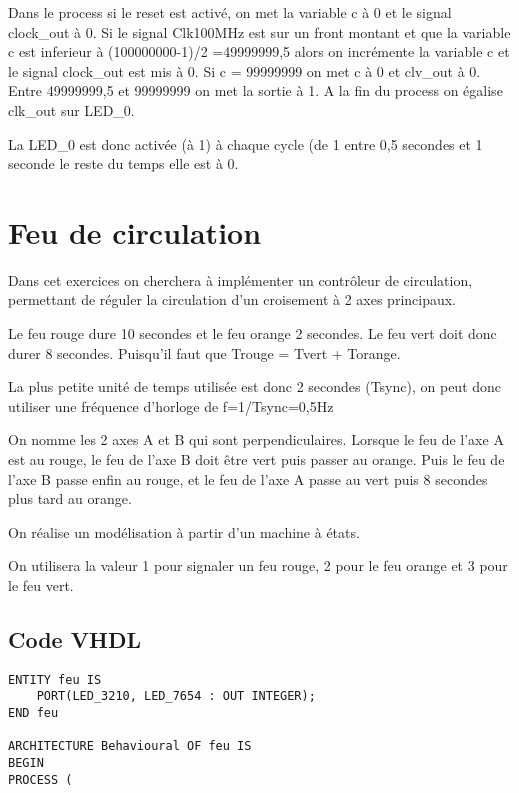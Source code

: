 \documentclass[11pt]{report}
\begin{document}
Dans le process si le reset est activé, on met la variable c à 0 et le signal clock\_out à 0. Si le signal Clk100MHz est sur un front montant et que la variable c est inferieur à (100000000-1)/2 =49999999,5 alors on incrémente la variable c et le signal clock\_out est mis à 0. Si c = 99999999 on met c à 0 et clv\_out à 0. Entre 49999999,5 et 99999999 on met la sortie à 1.
A la fin du process on égalise clk\_out sur LED\_0.

La LED\_0 est donc activée (à 1) à chaque cycle (de 1 entre 0,5 secondes et 1 seconde le reste du temps elle est à 0. 


\section{Feu de circulation}

Dans cet exercices on cherchera à implémenter un contrôleur de circulation, permettant de réguler la circulation d'un croisement à 2 axes principaux. 

Le feu rouge dure 10 secondes et le feu orange 2 secondes. Le feu vert doit donc durer 8 secondes. Puisqu'il faut que Trouge = Tvert + Torange. 

La plus petite unité de temps utilisée est donc 2 secondes (Tsync), on  peut donc utiliser une fréquence d'horloge de f=1/Tsync=0,5Hz

On nomme les 2 axes A et B qui sont perpendiculaires. Lorsque le feu de l'axe A est au rouge, le feu de l'axe B doit être vert puis passer au orange. Puis le feu de l'axe B passe enfin au rouge, et le feu de l'axe A passe au vert puis 8 secondes plus tard au orange. 

On réalise un modélisation à partir d'un machine à états. 

On utilisera la valeur 1 pour signaler un feu rouge, 2 pour le feu orange et 3 pour le feu vert. 

\subsection{Code VHDL}
\begin{lstlisting}
ENTITY feu IS
	PORT(LED_3210, LED_7654 : OUT INTEGER);
END feu

ARCHITECTURE Behavioural OF feu IS
BEGIN 
PROCESS (


\end{lstlisting}
\end{document}

